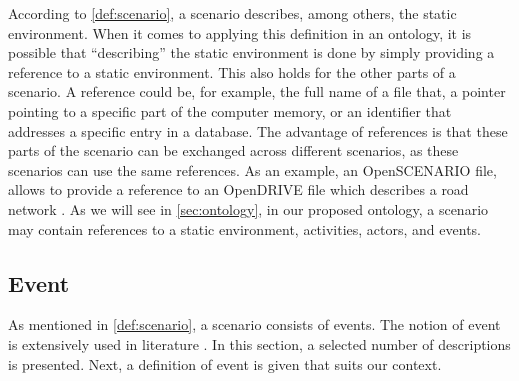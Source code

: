 \cbstartb
According to \cref{def:scenario}, a scenario describes, among others, the static environment. 
When it comes to applying this definition in an ontology, it is possible that ``describing'' the static environment is done by simply providing a reference to a static environment. 
This also holds for the other parts of a scenario. 
\cbstartd
A reference could be, for example, the full name of a file that, a pointer pointing to a specific part of the computer memory, or an identifier that addresses a specific entry in a database.
\cbstartc 
The advantage of references is that these parts of the scenario can be exchanged across different scenarios, as these scenarios can use the same references. 
\cbend
As an example, an OpenSCENARIO file, allows to provide a reference to an OpenDRIVE file which describes a road network \cite{dupuis2010opendrive}. As we will see in \cref{sec:ontology}, in our proposed ontology, a scenario may contain references to a static environment, activities, actors, and events.
\cbend



\subsection{Event}
\label{sec:event}
As mentioned in \cref{def:scenario}, a scenario consists of events. The notion of event is extensively used in literature \cite{breu1997towards, pfeiffer2013concepts, branicky1998hybridcontrol, deschutter2000optimal, heemels2012eventcontrol}. In this section, a selected number of descriptions is presented. Next, a definition of event is given that suits our context.

